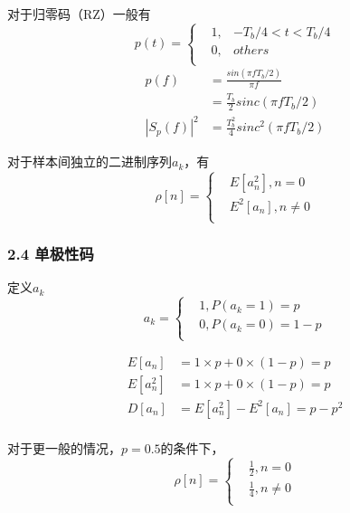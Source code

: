 \documentclass[
]{article}
\begin{document}
对于归零码（RZ）一般有
\begin{equation}
p(t) =\left\{
\begin{aligned}
&1, & -T_b/4 < t < T_b/4\\
&0, & others \\
\end{aligned}
\right.
\end{equation}
\begin{equation}
\begin{aligned}
p(f) &= \frac{sin(\pi f T_b/2)}{\pi f}\\
&=  \frac{T_b}{2} sinc(\pi f T_b/2)\\
{\left| S_p(f) \right|}^2 & = \frac{T_b^2}{4} sinc^2(\pi f T_b/2)
\end{aligned}
\end{equation}

对于样本间独立的二进制序列${a_k}$，有
\begin{equation}
\rho[n] =\left\{
\begin{aligned}
&E[a_n^2], n = 0\\
&E^2[a_n], n \neq 0 \\
\end{aligned}
\right.
\end{equation}

\hypertarget{header-n24}{%
\subsubsection{2.4 单极性码}\label{header-n24}}
定义${a_k}$
\begin{equation}
a_k =\left\{
\begin{aligned}
&1, P(a_k=1) = p\\
&0, P(a_k=0) = 1-p \\
\end{aligned}
\right.
\end{equation}

\begin{equation}
\begin{aligned}
E[a_n] &= 1\times p + 0\times(1-p)=p\\
E[a_n^2] &= 1\times p + 0\times(1-p)=p\\
D[a_n] &= E[a_n^2] - E^2[a_n]=p-p^2\\
\end{aligned}
\end{equation}



对于更一般的情况，$p = 0.5$的条件下，
\begin{equation}
\rho[n] =\left\{
\begin{aligned}
&\frac{1}{2}, n = 0\\
&\frac{1}{4}, n \neq 0 \\
\end{aligned}
\right.
\end{equation}
\end{document}
